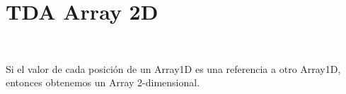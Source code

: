 
%





\separacion
\section{TDA Array 2D} \label{sec:arrayDosD}

\

Si el valor de cada posición de un Array1D es una referencia a otro Array1D, entonces obtenemos un Array 2-dimensional. 

